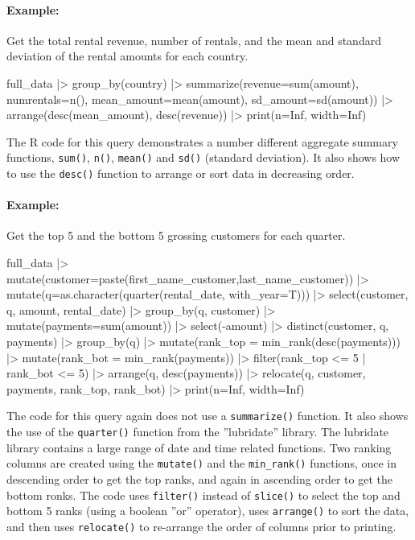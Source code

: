 \paragraph*{Example:} Get the total rental revenue, number of rentals, and the mean and standard deviation of the rental amounts for each country.

\begin{samepage}
\begin{Rcode}
full_data |>
  group_by(country) |>
  summarize(revenue=sum(amount), 
            numrentals=n(),
            mean_amount=mean(amount),
            sd_amount=sd(amount)) |>
  arrange(desc(mean_amount),
          desc(revenue)) |>
  print(n=Inf, width=Inf)  
\end{Rcode}
\end{samepage}

The R code for this query demonstrates a number different aggregate summary functions, \texttt{sum()}, \texttt{n()}, \texttt{mean()} and \texttt{sd()} (standard deviation). It also shows how to use the \texttt{desc()} function to arrange or sort data in decreasing order.

\paragraph*{Example:} Get the top 5 and the bottom 5 grossing customers for each quarter.

\begin{samepage}
\begin{Rcode}
full_data |>
  mutate(customer=paste(first_name_customer,last_name_customer)) |>
  mutate(q=as.character(quarter(rental_date, with_year=T))) |>
  select(customer, q, amount, rental_date) |>
  group_by(q, customer) |>
  mutate(payments=sum(amount)) |>
  select(-amount) |>
  distinct(customer, q, payments) |>
  group_by(q) |>
  mutate(rank_top = min_rank(desc(payments))) |>
  mutate(rank_bot = min_rank(payments)) |>
  filter(rank_top <= 5 | rank_bot <= 5) |>
  arrange(q, desc(payments)) |>
  relocate(q, customer, payments, rank_top, rank_bot) |>
  print(n=Inf, width=Inf)
\end{Rcode}
\end{samepage}

The code for this query again does not use a \texttt{summarize()} function. It also shows the use of the \texttt{quarter()} function from the ''lubridate'' library. The lubridate library contains a large range of date and time related functions. Two ranking columns are created using the \texttt{mutate()} and the \texttt{min\_rank()} functions, once in descending order to get the top ranks, and again in ascending order to get the bottom ronks. The code uses \texttt{filter()} instead of \texttt{slice()} to select the top and bottom 5 ranks (using a boolean ''or'' operator), uses \texttt{arrange()} to sort the data, and then uses \texttt{relocate()} to re-arrange the order of columns prior to printing.

